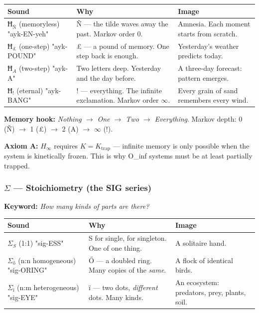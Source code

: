 \documentclass[12pt,a4paper]{article}
\begin{document}
\begin{table}[htbp]
\centering
\small
{}
\begin{tabularx}{\textwidth}{>{\centering\arraybackslash}X >{\centering\arraybackslash}X >{\centering\arraybackslash}X}
\toprule
\rowcolor{gray!25}\textbf{Sound} & \textbf{Why} & \textbf{Image} \\
\midrule
\rowcolors{1}{white}{gray!10}
\textbf{$Ħ_{\text{Ñ}}$} (memoryless) "ayk-EN-yeh" & Ñ --- the tilde waves away the past. Markov order 0. & Amnesia. Each moment starts from scratch. \\
\textbf{$Ħ_{\text{£}}$} (one-step) "ayk-POUND" & £ --- a pound of memory. One step back is enough. & Yesterday's weather predicts today. \\
\textbf{$Ħ_{A}$} (two-step) "ayk-A" & Two letters deep. Yesterday and the day before. & A three-day forecast: pattern emerges. \\
\textbf{$Ħ_{!}$} (eternal) "ayk-BANG" & ! --- everything. The infinite exclamation. Markov order $\infty$. & Every grain of sand remembers every wind. \\
\bottomrule
\end{tabularx}
\end{table}

\textbf{Memory hook:} \emph{Nothing $\rightarrow$ One $\rightarrow$ Two $\rightarrow$ Everything}. Markov depth: 0 (Ñ) $\rightarrow$ 1 (£) $\rightarrow$ 2 (A) $\rightarrow$ $\infty$ (!).

\textbf{Axiom A:} $H_{\infty}$ requires $K = K_{\text{trap}}$ --- infinite memory is only possible when the system is kinetically frozen. This is why O\_inf systems must be at least partially trapped.

\subsubsection{$\Sigma$ --- Stoichiometry (the \textbf{SIG} series)}

\textbf{Keyword:} \emph{How many kinds of parts are there?}

\begin{table}[htbp]
\centering
\small
{}
\begin{tabularx}{\textwidth}{>{\centering\arraybackslash}X >{\centering\arraybackslash}X >{\centering\arraybackslash}X}
\toprule
\rowcolor{gray!25}\textbf{Sound} & \textbf{Why} & \textbf{Image} \\
\midrule
\rowcolors{1}{white}{gray!10}
\textbf{$\Sigma_{S}$} (1:1) "sig-ESS" & S for single, for singleton. One of one thing. & A solitaire hand. \\
\textbf{$\Sigma_{\text{ő}}$} (n:n homogeneous) "sig-ORING" & Ő --- a doubled ring. Many copies of the \emph{same}. & A flock of identical birds. \\
\textbf{$\Sigma_{\text{ï}}$} (n:m heterogeneous) "sig-EYE" & ï --- two dots, \emph{different} dots. Many kinds. & An ecosystem: predators, prey, plants, soil. \\
\bottomrule
\end{tabularx}
\end{table}
\end{document}
